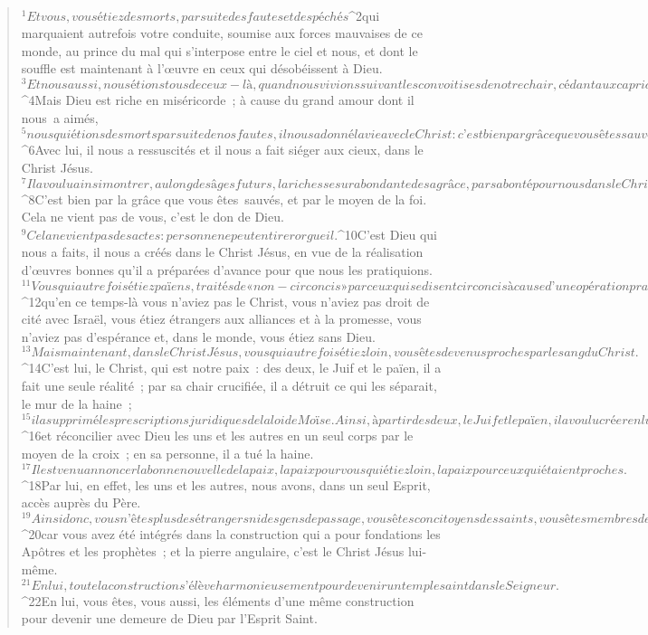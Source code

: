          
      \bchapter{}
      \begin{verse}
${}^{1}Et vous, vous étiez des morts, par suite des fautes et des péchés 
${}^{2}qui marquaient autrefois votre conduite, soumise aux forces mauvaises de ce monde, au prince du mal qui s’interpose entre le ciel et nous, et dont le souffle est maintenant à l’œuvre en ceux qui désobéissent à Dieu. 
${}^{3}Et nous aussi, nous étions tous de ceux-là, quand nous vivions suivant les convoitises de notre chair, cédant aux caprices de la chair et des pensées, nous qui étions, de par nous-mêmes, voués à la colère comme tous les autres.
${}^{4}Mais Dieu est riche en miséricorde ; à cause du grand amour dont il nous a aimés, 
${}^{5}nous qui étions des morts par suite de nos fautes, il nous a donné la vie avec le Christ : c’est bien par grâce que vous êtes sauvés. 
${}^{6}Avec lui, il nous a ressuscités et il nous a fait siéger aux cieux, dans le Christ Jésus. 
${}^{7}Il a voulu ainsi montrer, au long des âges futurs, la richesse surabondante de sa grâce, par sa bonté pour nous dans le Christ Jésus. 
${}^{8}C’est bien par la grâce que vous êtes sauvés, et par le moyen de la foi. Cela ne vient pas de vous, c’est le don de Dieu. 
${}^{9}Cela ne vient pas des actes : personne ne peut en tirer orgueil. 
${}^{10}C’est Dieu qui nous a faits, il nous a créés dans le Christ Jésus, en vue de la réalisation d’œuvres bonnes qu’il a préparées d’avance pour que nous les pratiquions.
${}^{11}Vous qui autrefois étiez païens, traités de « non-circoncis » par ceux qui se disent circoncis à cause d’une opération pratiquée dans la chair, souvenez-vous donc 
${}^{12}qu’en ce temps-là vous n’aviez pas le Christ, vous n’aviez pas droit de cité avec Israël, vous étiez étrangers aux alliances et à la promesse, vous n’aviez pas d’espérance et, dans le monde, vous étiez sans Dieu. 
${}^{13}Mais maintenant, dans le Christ Jésus, vous qui autrefois étiez loin, vous êtes devenus proches par le sang du Christ. 
${}^{14}C’est lui, le Christ, qui est notre paix : des deux, le Juif et le païen, il a fait une seule réalité ; par sa chair crucifiée, il a détruit ce qui les séparait, le mur de la haine ; 
${}^{15}il a supprimé les prescriptions juridiques de la loi de Moïse. Ainsi, à partir des deux, le Juif et le païen, il a voulu créer en lui un seul Homme nouveau en faisant la paix, 
${}^{16}et réconcilier avec Dieu les uns et les autres en un seul corps par le moyen de la croix ; en sa personne, il a tué la haine. 
${}^{17}Il est venu annoncer la bonne nouvelle de la paix, la paix pour vous qui étiez loin, la paix pour ceux qui étaient proches. 
${}^{18}Par lui, en effet, les uns et les autres, nous avons, dans un seul Esprit, accès auprès du Père.
${}^{19}Ainsi donc, vous n’êtes plus des étrangers ni des gens de passage, vous êtes concitoyens des saints, vous êtes membres de la famille de Dieu, 
${}^{20}car vous avez été intégrés dans la construction qui a pour fondations les Apôtres et les prophètes ; et la pierre angulaire, c’est le Christ Jésus lui-même. 
${}^{21}En lui, toute la construction s’élève harmonieusement pour devenir un temple saint dans le Seigneur. 
${}^{22}En lui, vous êtes, vous aussi, les éléments d’une même construction pour devenir une demeure de Dieu par l’Esprit Saint.
      

\end{verse}
